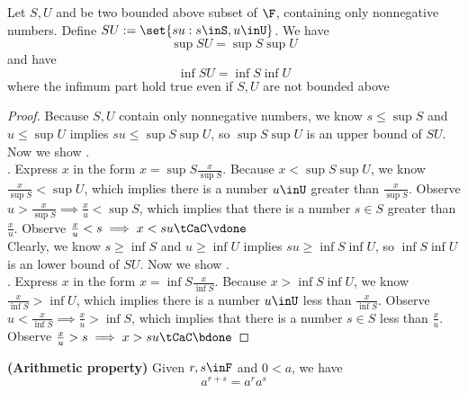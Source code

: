 \documentclass{report}
\begin{document}
\begin{lemma}
\label{1.4.5}
Let $S,U$ and be two bounded above subset of  $\F$, containing only nonnegative numbers. Define $SU:=\set{su:s\inS,u\inU}$. We have    
\begin{equation*}
\sup SU=\sup S \sup U 
\end{equation*}
and have 
\begin{equation*}
\inf SU=\inf S\inf U
\end{equation*}
where the infimum part hold true even if $S,U$ are not bounded above 
\end{lemma}
\begin{proof}
Because $S,U$ contain only nonnegative numbers, we know $s\leq \sup S$ and $u\leq \sup U$ implies $su\leq \sup S \sup U$, so $\sup S \sup U$ is an upper bound of $SU$. Now we show .\\

. Express $x$ in the form  $x=\sup S \frac{x}{\sup S}$. Because $x<\sup S \sup U $, we know $\frac{x}{\sup S}<\sup U$, which implies there is a number  $u\inU$ greater than $\frac{x}{\sup S}$. Observe $u>\frac{x}{\sup S}\implies \frac{x}{u}<\sup S$, which implies that there is a number $s\in S$ greater than  $\frac{x}{u}$. Observe  $\frac{x}{u}<s\implies x<su \tCaC\vdone$\\ 

Clearly, we know $s\geq \inf  S$ and $u\geq \inf  U$ implies $su\geq \inf  S \inf  U$, so $\inf  S \inf  U$ is an lower bound of $SU$. Now we show .\\

. Express $x$ in the form  $x=\inf  S \frac{x}{\inf  S}$. Because $x>\inf  S \inf  U $, we know $\frac{x}{\inf  S}>\inf  U$, which implies there is a number  $u\inU$ less than $\frac{x}{\inf  S}$. Observe $u<\frac{x}{\inf  S}\implies \frac{x}{u}>\inf  S$, which implies that there is a number $s\in S$ less than  $\frac{x}{u}$. Observe  $\frac{x}{u}>s\implies x>su \tCaC\bdone$  
\end{proof}

\begin{theorem}
\label{1.4.6}
\textbf{(Arithmetic property)} Given $r,s\inF$ and $0<a$, we have
\begin{equation*}
  a^{r+s}=a^ra^s
\end{equation*}
\end{theorem}
\end{document}
